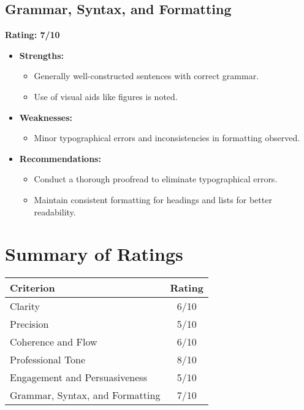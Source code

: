 \documentclass{article}
\begin{document}
\subsection{Grammar, Syntax, and Formatting}
\textbf{Rating: 7/10}

\begin{itemize}
    \item \textbf{Strengths:}
    \begin{itemize}
        \item Generally well-constructed sentences with correct grammar.
        \item Use of visual aids like figures is noted.
    \end{itemize}
    \item \textbf{Weaknesses:}
    \begin{itemize}
        \item Minor typographical errors and inconsistencies in formatting observed.
    \end{itemize}
    \item \textbf{Recommendations:}
    \begin{itemize}
        \item Conduct a thorough proofread to eliminate typographical errors.
        \item Maintain consistent formatting for headings and lists for better readability.
    \end{itemize}
\end{itemize}

\newpage
\section{Summary of Ratings}

\begin{center}
\begin{tabular}{|l|c|}
\hline
\textbf{Criterion} & \textbf{Rating} \\
\hline
Clarity & 6/10 \\
Precision & 5/10 \\
Coherence and Flow & 6/10 \\
Professional Tone & 8/10 \\
Engagement and Persuasiveness & 5/10 \\
Grammar, Syntax, and Formatting & 7/10 \\
\hline
\end{tabular}
\end{center}
\end{document}
